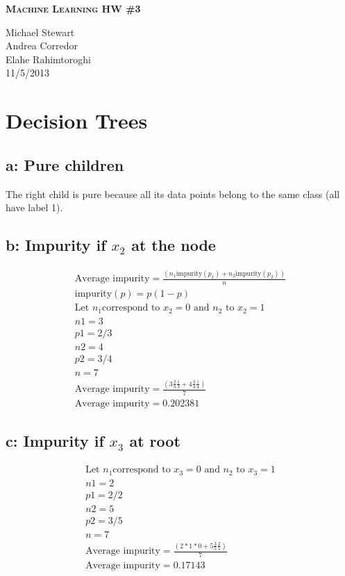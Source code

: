 \documentclass{article}
\newcommand{\header}[5]{
        \begin{minipage}[h!]{0.63\textwidth}
                \centering
                { \LARGE \textbf{ \textsc{#1} } }
        \end{minipage}
        \begin{minipage}[h!]{0.37\textwidth}
                \centering
                {#2}\\
                {#3}\\
        \end{minipage}
}
\begin{document}
\header{Machine Learning HW \#3}
       {Michael Stewart\\Andrea Corredor\\Elahe Rahimtoroghi}
       {11/5/2013}
\\\\


\section{Decision Trees}

\subsection*{a: Pure children}
The right child is pure because all its data points belong to the same class (all have label 1).

\subsection*{b: Impurity if $x_2$ at the node}
\begin{align*}
\text{Average impurity} = \frac{\left( n_1 \text{impurity}(p_1) + n_2 \text{impurity}(p_2) \right)}{n} \\
\text{impurity}(p) = p(1-p) \\ %
\text{Let } n_1 \text{correspond to } x_2 = 0 \text{ and } n_2 \text{ to } x_2 = 1 \\
n1 = 3 \\
p1 = 2/3 \\
n2 = 4 \\
p2 = 3/4 \\
n = 7 \\
\text{Average impurity} = \frac{\left( 3\frac{2}{3}\frac{1}{3}  + 4 \frac{3}{4}\frac{1}{4} \right)}{7} \\
\text{Average impurity} = 0.202381
\end{align*}
\subsection*{c: Impurity if $x_3$ at root}
\begin{align*}
\text{Let } n_1 \text{correspond to } x_3 = 0 \text{ and } n_2 \text{ to } x_3 = 1 \\
n1 = 2 \\
p1 = 2/2 \\
n2 = 5 \\
p2 = 3/5 \\
n = 7 \\
\text{Average impurity} = \frac{\left( 2*1*0  + 5 \frac{3}{5}\frac{2}{5} \right)}{7} \\
\text{Average impurity} = 0.17143
\end{align*}
\end{document}
